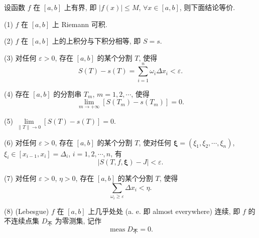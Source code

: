 \begin{theorem}\label{thm:6.1.4}
设函数 $f$ 在 $[a,b]$ 上有界, 即 $|f(x)|\leqslant M$, $\forall x\in[a,b]$, 则下面结论等价.

(1) $f$ 在 $[a,b]$ 上 Riemann 可积.

(2) $f$ 在 $[a,b]$ 上的上积分与下积分相等, 即 $S=s$.

(3) 对任何 $\varepsilon>0$, 存在 $[a,b]$ 的某个分割 $T$, 使得
\[
S(T)-s(T)=\sum_{i=1}^{n}\omega_{i}\Delta x_{i}<\varepsilon.
\]

(4) 存在 $[a,b]$ 的分割串 $T_{m}$, $m=1,2,\cdots$, 使得
\[
\lim_{m\to+\infty}\left[S(T_{m})-s(T_{m})\right]=0.
\]

(5) $\lim\limits_{\|T\|\to 0}\left[S(T)-s(T)\right]=0$.

(6) 对任何 $\varepsilon>0$, 存在 $[a,b]$ 的某个分割 $T$, 使对任何 $\boldsymbol{\xi}=(\xi_{1},\xi_{2},\cdots,\xi_{n})$, $\xi_{i}\in[x_{i-1},x_{i}]=\Delta_{i}$, $i=1,2,\cdots,n$, 有
\[
\left|S(T,f,\boldsymbol{\xi})-J\right|<\varepsilon.
\]

(7) 对任何 $\varepsilon>0$, $\eta>0$, 存在 $[a,b]$ 的某个分割 $T$, 使得
\[
\sum_{\omega_{i}\geqslant\varepsilon}\Delta x_{i}<\eta.
\]

(8) (Lebesgue) $f$ 在 $[a,b]$ 上几乎处处 (a. e. 即 almost everywhere) 连续, 即 $f$ 的不连续点集 $D_{\text{不}}$ 为零测集, 记作
\[
\operatorname{meas}D_{\text{不}}=0.
\]
\end{theorem}

